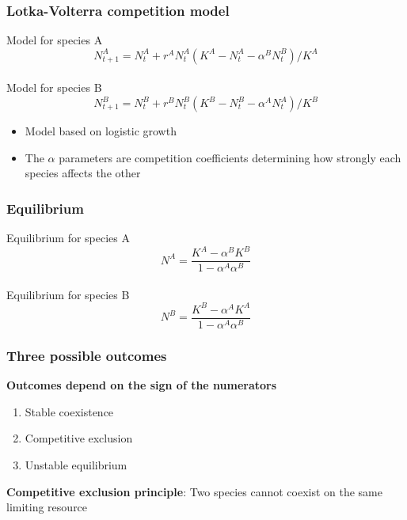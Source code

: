 \documentclass[color=usenames,dvipsnames]{beamer}\usepackage[]{graphicx}\usepackage[]{color}
\begin{document}
\begin{frame}
  \frametitle{Lotka-Volterra competition model}
  \Large
  Model for species A
  \[
    N^A_{t+1} = N^A_t + r^A N^A_t(K^A - N^A_t - \alpha^B N^B_t) / K^A
  \] \\
  \vfill %
  \pause
  Model for species B
  \[
    N^B_{t+1} = N^B_t + r^B N^B_t(K^B - N^B_t - \alpha^A N^A_t) / K^B
  \]
  \pause
  \vfill
  \normalsize
  \begin{itemize}
  \item Model based on logistic growth
  \item The $\alpha$ parameters are competition coefficients
    determining how strongly each species affects the other
  \end{itemize}
\end{frame}



\begin{frame}
  \frametitle{Equilibrium}
  \Large
  Equilibrium for species A
  \[
    N^A = \frac{K^A - \alpha^B K^B}{1 - \alpha^A \alpha^B}
  \] \\
  \vspace{1cm}
  \pause
  Equilibrium for species B
  \[
    N^B = \frac{K^B - \alpha^A K^A}{1 - \alpha^A \alpha^B}
  \]
\end{frame}


\begin{frame}
  \frametitle{Three possible outcomes}
  \large
  {\bf Outcomes depend on the sign of the numerators}
  \begin{enumerate}[(1)]
    \item Stable coexistence
    \item Competitive exclusion
    \item Unstable equilibrium
  \end{enumerate}
  \pause
  \vfill
    \large %
    {\bf Competitive exclusion principle}:
    Two species cannot coexist on the same limiting resource
\end{frame}
\end{document}
